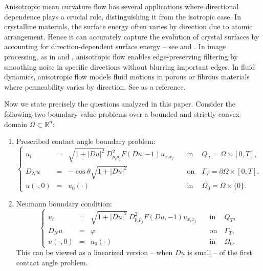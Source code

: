 \documentclass[12pt]{article}
\numberwithin{equation}{section}
\theoremstyle{plain}
\theoremstyle{definition}
\theoremstyle{remark}
\begin{document}
Anisotropic mean curvature flow has several applications where directional dependence plays a crucial role, distinguishing it from the isotropic case. In crystalline materials, the surface energy often varies by direction due to atomic arrangement. Hence it can accurately capture the evolution of crystal surfaces by accounting for direction-dependent surface energy -- see \cite{cahn1993equilibrium} and \cite{taylor1993motion}.
In image processing, as in \cite{alvarez1992image} and \cite{sochen1998general}, anisotropic flow enables edge-preserving filtering by smoothing noise in specific directions without blurring important edges. 
In fluid dynamics, anisotropic flow models fluid motions in porous or fibrous materials where permeability varies by direction. See \cite{garcke1998anisotropic} as a reference.


Now we state precisely the questions analyzed in this paper. Consider the following two boundary value problems over a bounded and strictly convex domain $\Omega \subset \mathbb{R}^{n}$:
 \begin{enumerate}
\item Prescribed contact angle boundary problem:
\begin{equation} \label{eq:angpro}
    \left\{ \begin{array}{cllcl}
            u_t & = & \sqrt{1+|Du|^2} \  D^2_{p_i p_j} F (Du,-1) u_{x_i x_j}   \quad &  \text{in} & \ Q_T = \Omega \times [0,T], \\
            D_N u & = & -  \cos \theta \sqrt{1+|Du|^2}  \quad &  \text{on} & \ \Gamma_T=\partial \Omega \times [0,T],  \\
         u(\cdot,0) & = & u_0(\cdot)  \quad \ & \text{in} & \ \Omega_0 = \Omega \times\{0\}.
    \end{array}  \right.
\end{equation}

\item Neumann boundary condition:
\begin{equation} \label{eq:neupro}
    \left\{ \begin{array}{cllcl}
            u_t & = & \sqrt{1+|Du|^2} \  D^2_{p_i p_j} F (Du,-1) u_{x_i x_j}   \quad &  \text{in} & \ Q_T, \\
            D_N u & = & \varphi  \quad &  \text{on} & \ \Gamma_T,  \\
         u(\cdot,0) & = & u_0(\cdot)  \quad \ & \text{in} & \  \Omega_0.
    \end{array}  \right.
\end{equation}
This can be viewed as a linearized version -- when $Du$ is small -- of the first contact angle problem.
\end{enumerate}
 
\end{document}
